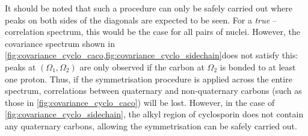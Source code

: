 \documentclass[a4paper,12pt]{article}
\newcommand{\carbon}{\ch{^{13}C}}
\begin{document}
\begin{refsection}
It should be noted that such a procedure can only be safely carried out where peaks on both sides of the diagonals are expected to be seen.
For a \textit{true} \carbon{}--\carbon{} correlation spectrum, this would be the case for all pairs of \carbon{} nuclei.
However, the covariance spectrum shown in \cref{fig:covariance_cyclo_caco,fig:covariance_cyclo_sidechain}does not satisfy this: peaks at $(\Omega_1, \Omega_2)$ are only observed if the carbon at $\Omega_2$ is bonded to at least one proton.
Thus, if the symmetrisation procedure is applied across the entire spectrum, correlations between quaternary and non-quaternary carbons (such as those in \cref{fig:covariance_cyclo_caco}) will be lost.
However, in the case of \cref{fig:covariance_cyclo_sidechain}, the alkyl region of cyclosporin does not contain any quaternary carbons, allowing the symmetrisation can be safely carried out.

\clearpage

\AtNextBibliography{\small}
\printbibliography{}
\clearpage    %

\end{refsection}
\end{document}
